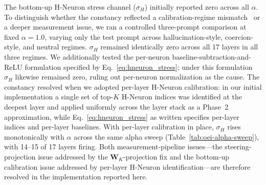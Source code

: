 \documentclass{article}
\begin{document}
The bottom-up H-Neuron stress channel ($\sigma_H$) initially reported zero across all $\alpha$. To distinguish whether the constancy reflected a calibration-regime mismatch~\cite{gao2025hneurons} or a deeper measurement issue, we ran a controlled three-prompt comparison at fixed $\alpha = 1.0$, varying only the test prompt across hallucination-style, coercion-style, and neutral regimes. $\sigma_H$ remained identically zero across all 17 layers in all three regimes. We additionally tested the per-neuron baseline-subtraction-and-ReLU formulation specified by Eq.~\ref{eq:hneuron_stress}; under this formulation $\sigma_H$ likewise remained zero, ruling out per-neuron normalization as the cause. The constancy resolved when we adopted per-layer H-Neuron calibration: in our initial implementation a single set of top-$K$ H-Neuron indices was identified at the deepest layer and applied uniformly across the layer stack as a Phase~2 approximation, while Eq.~\ref{eq:hneuron_stress} as written specifies per-layer indices and per-layer baselines. With per-layer calibration in place, $\sigma_H$ rises monotonically with $\alpha$ across the same alpha sweep (Table~\ref{tab:oei-alpha-sweep}), with 14--15 of 17 layers firing. Both measurement-pipeline issues---the steering-projection issue addressed by the $\mathbf{W}_K$-projection fix and the bottom-up calibration issue addressed by per-layer H-Neuron identification---are therefore resolved in the implementation reported here.
\end{document}
